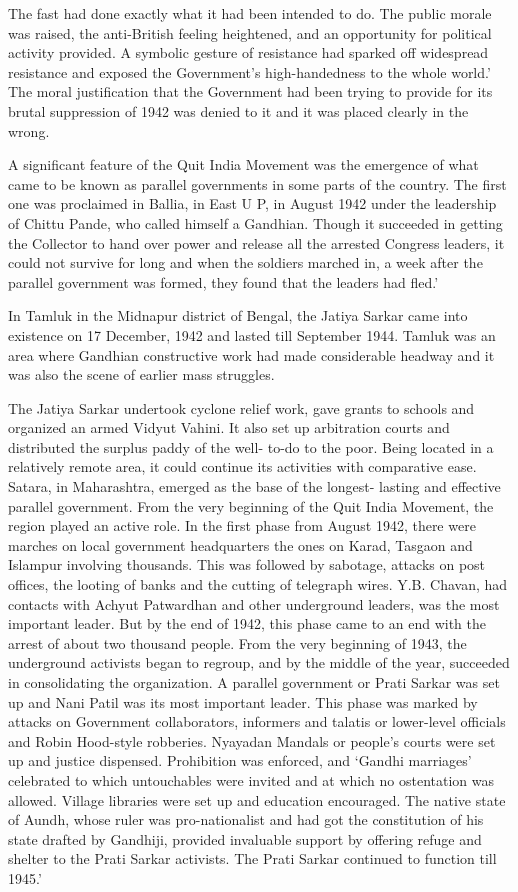 \begin{multicols}{2}
The fast had done exactly what it had been intended to do. The public morale was raised, the anti-British feeling heightened, and an opportunity for political activity provided. A symbolic gesture of resistance had sparked off widespread resistance and exposed the Government's high-handedness to the whole world.' The moral justification that the Government had been trying to provide for its brutal suppression of 1942 was denied to it and it was placed clearly in the wrong.

A significant feature of the Quit India Movement was the emergence of what came to be known as parallel governments in some parts of the country. The first one was proclaimed in Ballia, in East U P, in August 1942 under the leadership of Chittu Pande, who called himself a Gandhian. Though it succeeded in getting the Collector to hand over power and release all the arrested Congress leaders, it could not survive for long and when the soldiers marched in, a week after the parallel government was formed, they found that the leaders had fled.'

In Tamluk in the Midnapur district of Bengal, the Jatiya Sarkar came into existence on 17 December, 1942 and lasted till September 1944. Tamluk was an area where Gandhian constructive work had made considerable headway and it was also the scene of earlier mass struggles.

The Jatiya Sarkar undertook cyclone relief work, gave grants to schools and organized an armed Vidyut Vahini. It also set up arbitration courts and distributed the surplus paddy of the well- to-do to the poor. Being located in a relatively remote area, it could continue its activities with comparative ease. Satara, in Maharashtra, emerged as the base of the longest- lasting and effective parallel government. From the very beginning of the Quit India Movement, the region played an active role. In the first phase from August 1942, there were marches on local government headquarters the ones on Karad, Tasgaon and Islampur involving thousands. This was followed by sabotage, attacks on post offices, the looting of banks and the cutting of telegraph wires. Y.B. Chavan, had contacts with Achyut Patwardhan and other underground leaders, was the most important leader. But by the end of 1942, this phase came to an end with the arrest of about two thousand people. From the very beginning of 1943, the underground activists began to regroup, and by the middle of the year, succeeded in consolidating the organization. A parallel government or Prati Sarkar was set up and Nani Patil was its most important leader. This phase was marked by attacks on Government collaborators, informers and talatis or lower-level officials and Robin Hood-style robberies. Nyayadan Mandals or people's courts were set up and justice dispensed. Prohibition was enforced, and `Gandhi marriages' celebrated to which untouchables were invited and at which no ostentation was allowed. Village libraries were set up and education encouraged. The native state of Aundh, whose ruler was pro-nationalist and had got the constitution of his state drafted by Gandhiji, provided invaluable support by offering refuge and shelter to the Prati Sarkar activists. The Prati Sarkar continued to function till 1945.'


\end{multicols}
